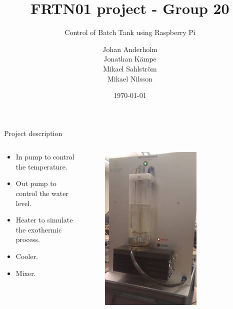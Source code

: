 \documentclass{beamer}
\begin{document}
\title{FRTN01 project - Group 20}
\subtitle{Control of Batch Tank using Raspberry Pi}
\author{Johan Anderholm \\ Jonathan Kämpe \\ Mikael Sahlström \\ Mikael Nilsson}
\date{\today}

\begin{frame}[plain]
  \titlepage
\end{frame}

\begin{frame}{Project description}
\begin{columns}[T]
    \begin{column}{.55\textwidth}
        \begin{itemize}
            \item In pump to control the temperature.
            \item Out pump to control the water level.
            \item Heater to simulate the exothermic process.
            \item Cooler.
            \item Mixer.
        \end{itemize}
    \end{column}
    \begin{column}{.45\textwidth}

        \begin{figure}[H]
           \centering
           \includegraphics[width=0.7\textwidth]{batchprocess.jpg}
        \end{figure}

    \end{column}
\end{columns}
\end{frame}
\end{document}
